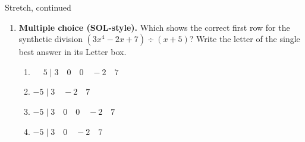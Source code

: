\documentclass[12pt]{article}
\begin{document}
\begin{notesbox}{Stretch, continued}
\begin{enumerate}[leftmargin=1.9em, itemsep=10pt, start=3]
  \item \textbf{Multiple choice (SOL-style).} Which shows the correct first row for the
    synthetic division $(3x^4 - 2x + 7) \div (x + 5)$? Write the letter of the single best
    answer in its Letter box.
    \begin{enumerate}[label=(\Alph*), leftmargin=2.0em, itemsep=3pt]
      \item $\phantom{-}5 \;\big|\; 3 \quad 0 \quad 0 \quad -2 \quad 7$
      \item $-5 \;\big|\; 3 \quad -2 \quad 7$
      \item $-5 \;\big|\; 3 \quad 0 \quad 0 \quad -2 \quad 7$
      \item $-5 \;\big|\; 3 \quad 0 \quad -2 \quad 7$
    \end{enumerate}
\end{enumerate}
\end{notesbox}
\end{document}
